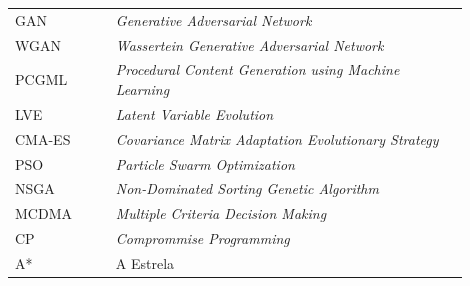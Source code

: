 

\begin{listaacron}

\begin{longtable}[l]{p{0.2\linewidth}p{0.7\linewidth}}
	GAN & \textit{Generative Adversarial Network} \\
	WGAN & \textit{Wassertein Generative Adversarial Network} \\
	PCGML & \textit{Procedural Content Generation using Machine Learning} \\
	LVE & \textit{Latent Variable Evolution} \\
	CMA-ES & \textit{Covariance Matrix Adaptation Evolutionary Strategy} \\
	PSO & \textit{Particle Swarm Optimization} \\
	NSGA & \textit{Non-Dominated Sorting Genetic Algorithm} \\
	MCDMA & \textit{Multiple Criteria Decision Making} \\
	CP & \textit{Comprommise Programming} \\
	A* & A Estrela \\
\end{longtable}

\end{listaacron}

